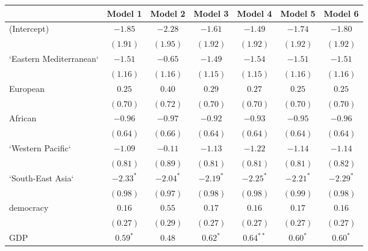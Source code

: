 
\begin{table}[!h]
\begin{center}
\begin{tabular}{l c c c c c c }
\toprule
 & Model 1 & Model 2 & Model 3 & Model 4 & Model 5 & Model 6 \\
\midrule
(Intercept)             & $-1.85$      & $-2.28$      & $-1.61$      & $-1.49$      & $-1.74$      & $-1.80$      \\
                        & $(1.91)$     & $(1.95)$     & $(1.92)$     & $(1.92)$     & $(1.92)$     & $(1.92)$     \\
`Eastern Mediterranean` & $-1.51$      & $-0.65$      & $-1.49$      & $-1.54$      & $-1.51$      & $-1.51$      \\
                        & $(1.16)$     & $(1.16)$     & $(1.15)$     & $(1.15)$     & $(1.16)$     & $(1.16)$     \\
European                & $0.25$       & $0.40$       & $0.29$       & $0.27$       & $0.25$       & $0.25$       \\
                        & $(0.70)$     & $(0.72)$     & $(0.70)$     & $(0.70)$     & $(0.70)$     & $(0.70)$     \\
African                 & $-0.96$      & $-0.97$      & $-0.92$      & $-0.93$      & $-0.95$      & $-0.96$      \\
                        & $(0.64)$     & $(0.66)$     & $(0.64)$     & $(0.64)$     & $(0.64)$     & $(0.64)$     \\
`Western Pacific`       & $-1.09$      & $-0.11$      & $-1.13$      & $-1.22$      & $-1.14$      & $-1.14$      \\
                        & $(0.81)$     & $(0.89)$     & $(0.81)$     & $(0.81)$     & $(0.81)$     & $(0.82)$     \\
`South-East Asia`       & $-2.33^{*}$  & $-2.04^{*}$  & $-2.19^{*}$  & $-2.25^{*}$  & $-2.21^{*}$  & $-2.29^{*}$  \\
                        & $(0.98)$     & $(0.97)$     & $(0.98)$     & $(0.98)$     & $(0.99)$     & $(0.98)$     \\
democracy               & $0.16$       & $0.55$       & $0.17$       & $0.16$       & $0.17$       & $0.16$       \\
                        & $(0.27)$     & $(0.29)$     & $(0.27)$     & $(0.27)$     & $(0.27)$     & $(0.27)$     \\
GDP                     & $0.59^{*}$   & $0.48$       & $0.62^{*}$   & $0.64^{**}$  & $0.60^{*}$   & $0.60^{*}$   \\

\end{tabular}
\end{center}
\end{table}

